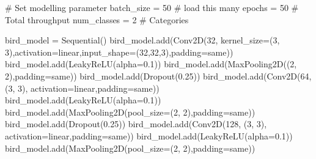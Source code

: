 \documentclass[
  letterpaper,
  DIV=11,
  numbers=noendperiod]{scrartcl}
\newenvironment{Shaded}{\begin{snugshade}}{\end{snugshade}}
\newcommand{\CommentTok}[1]{\textcolor[rgb]{0.37,0.37,0.37}{#1}}
\newcommand{\DecValTok}[1]{\textcolor[rgb]{0.68,0.00,0.00}{#1}}
\newcommand{\FloatTok}[1]{\textcolor[rgb]{0.68,0.00,0.00}{#1}}
\newcommand{\NormalTok}[1]{\textcolor[rgb]{0.00,0.23,0.31}{#1}}
\newcommand{\OperatorTok}[1]{\textcolor[rgb]{0.37,0.37,0.37}{#1}}
\newcommand{\StringTok}[1]{\textcolor[rgb]{0.13,0.47,0.30}{#1}}
\begin{document}
\begin{Shaded}
\begin{Highlighting}[]
\CommentTok{\# Set modelling parameter }
\NormalTok{batch\_size }\OperatorTok{=} \DecValTok{50} \CommentTok{\# load this many}
\NormalTok{epochs }\OperatorTok{=} \DecValTok{50}     \CommentTok{\# Total throughput }
\NormalTok{num\_classes }\OperatorTok{=} \DecValTok{2} \CommentTok{\# Categories}

\NormalTok{bird\_model }\OperatorTok{=}\NormalTok{ Sequential()}
\NormalTok{bird\_model.add(Conv2D(}\DecValTok{32}\NormalTok{, kernel\_size}\OperatorTok{=}\NormalTok{(}\DecValTok{3}\NormalTok{, }\DecValTok{3}\NormalTok{),activation}\OperatorTok{=}\StringTok{\textquotesingle{}linear\textquotesingle{}}\NormalTok{,input\_shape}\OperatorTok{=}\NormalTok{(}\DecValTok{32}\NormalTok{,}\DecValTok{32}\NormalTok{,}\DecValTok{3}\NormalTok{),padding}\OperatorTok{=}\StringTok{\textquotesingle{}same\textquotesingle{}}\NormalTok{))}
\NormalTok{bird\_model.add(LeakyReLU(alpha}\OperatorTok{=}\FloatTok{0.1}\NormalTok{))}
\NormalTok{bird\_model.add(MaxPooling2D((}\DecValTok{2}\NormalTok{, }\DecValTok{2}\NormalTok{),padding}\OperatorTok{=}\StringTok{\textquotesingle{}same\textquotesingle{}}\NormalTok{))}
\NormalTok{bird\_model.add(Dropout(}\FloatTok{0.25}\NormalTok{))}
\NormalTok{bird\_model.add(Conv2D(}\DecValTok{64}\NormalTok{, (}\DecValTok{3}\NormalTok{, }\DecValTok{3}\NormalTok{), activation}\OperatorTok{=}\StringTok{\textquotesingle{}linear\textquotesingle{}}\NormalTok{,padding}\OperatorTok{=}\StringTok{\textquotesingle{}same\textquotesingle{}}\NormalTok{))}
\NormalTok{bird\_model.add(LeakyReLU(alpha}\OperatorTok{=}\FloatTok{0.1}\NormalTok{))}
\NormalTok{bird\_model.add(MaxPooling2D(pool\_size}\OperatorTok{=}\NormalTok{(}\DecValTok{2}\NormalTok{, }\DecValTok{2}\NormalTok{),padding}\OperatorTok{=}\StringTok{\textquotesingle{}same\textquotesingle{}}\NormalTok{))}
\NormalTok{bird\_model.add(Dropout(}\FloatTok{0.25}\NormalTok{))}
\NormalTok{bird\_model.add(Conv2D(}\DecValTok{128}\NormalTok{, (}\DecValTok{3}\NormalTok{, }\DecValTok{3}\NormalTok{), activation}\OperatorTok{=}\StringTok{\textquotesingle{}linear\textquotesingle{}}\NormalTok{,padding}\OperatorTok{=}\StringTok{\textquotesingle{}same\textquotesingle{}}\NormalTok{))}
\NormalTok{bird\_model.add(LeakyReLU(alpha}\OperatorTok{=}\FloatTok{0.1}\NormalTok{))                  }
\NormalTok{bird\_model.add(MaxPooling2D(pool\_size}\OperatorTok{=}\NormalTok{(}\DecValTok{2}\NormalTok{, }\DecValTok{2}\NormalTok{),padding}\OperatorTok{=}\StringTok{\textquotesingle{}same\textquotesingle{}}\NormalTok{))}

\end{Highlighting}
\end{Shaded}
\end{document}
